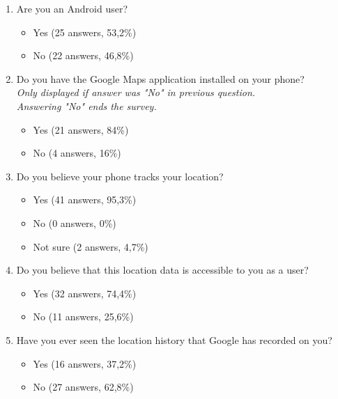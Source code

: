 \documentclass[12p]{article}
\begin{document}
\begin{enumerate}
    \item Are you an Android user?
    \begin{itemize}
        \item Yes (25 answers, 53,2\%)
        \item No (22 answers, 46,8\%)
    \end{itemize}
    
    \item Do you have the Google Maps application installed on your phone?
    \\\textit{Only displayed if answer was "No" in previous question.}
    \\\textit{Answering "No" ends the survey.}
    \begin{itemize}
        \item Yes (21 answers, 84\%)
        \item No (4 answers, 16\%)
    \end{itemize}
    
    \item Do you believe your phone tracks your location?
    \begin{itemize}
        \item Yes (41 answers, 95,3\%)
        \item No (0 answers, 0\%)
        \item Not sure (2 answers, 4,7\%)
    \end{itemize}
    
    \item Do you believe that this location data is accessible to you as a user?
    \begin{itemize}
        \item Yes (32 answers, 74,4\%)
        \item No (11 answers, 25,6\%)
    \end{itemize}
    
    \item Have you ever seen the location history that Google has recorded on you?
    \begin{itemize}
        \item Yes (16 answers, 37,2\%)
        \item No (27 answers, 62,8\%)
    \end{itemize}
    

\end{enumerate}
\end{document}
